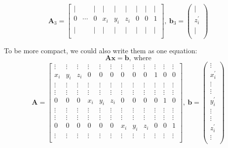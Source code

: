 \begin{questions}
\begin{parts}
\begin{solution}
    \[ \mathbf{A}_{3} = \begin{bmatrix}
    \vert &  & \vert & \vert &\vert  & \vert & \vert & \vert & \vert\\
    0 & \cdots & 0 & x_{i} & y_{i} & z_{i} & 0     & 0 & 1    \\
    \vert &  & \vert & \vert &\vert  & \vert & \vert & \vert & \vert\\
    \end{bmatrix}, \ \mathbf{b}_{3} = \left( \begin{array} {c} \vert \\ z_{i}^{'} \\ \vert \\ \end{array} \right) \]
    
    To be more compact, we could also write them as one equation:
    \[ \mathbf{A} \mathbf{x} = \mathbf{b}, \ \text{where} \]
    \[ \mathbf{A} = \begin{bmatrix}
        \vdots & \vdots & \vdots & \vdots & \vdots & \vdots & \vdots & \vdots & \vdots& \vdots& \vdots& \vdots\\
        x_{i} & y_{i} & z_{i} & 0& 0& 0& 0& 0&  0     & 1     & 0     & 0    \\
        \vdots & \vdots & \vdots & \vdots & \vdots & \vdots & \vdots & \vdots & \vdots& \vdots& \vdots& \vdots\\
        
        \vdots & \vdots & \vdots & \vdots & \vdots & \vdots & \vdots & \vdots & \vdots& \vdots& \vdots& \vdots\\
        0& 0& 0& x_{i} & y_{i} & z_{i} &  0& 0&  0     & 0     & 1     & 0    \\
        \vdots & \vdots & \vdots & \vdots & \vdots & \vdots & \vdots & \vdots & \vdots& \vdots& \vdots& \vdots\\
        
        \vdots & \vdots & \vdots & \vdots & \vdots & \vdots & \vdots & \vdots & \vdots& \vdots& \vdots& \vdots\\
        0& 0& 0& 0& 0&  0&x_{i} & y_{i} & z_{i} &  0     & 0     & 1    \\
        \vdots & \vdots & \vdots & \vdots & \vdots & \vdots & \vdots & \vdots & \vdots& \vdots& \vdots& \vdots\\
    \end{bmatrix}, \ \mathbf{b} = \left( \begin{array} {c} \vdots \\ x_{i}^{'} \\ \vdots \\ \vdots \\ y_{i}^{'} \\ \vdots \\ \vdots \\ z_{i}^{'} \\ \vdots \\ \end{array} \right)\]
\end{solution}


\end{parts}
\end{questions}
